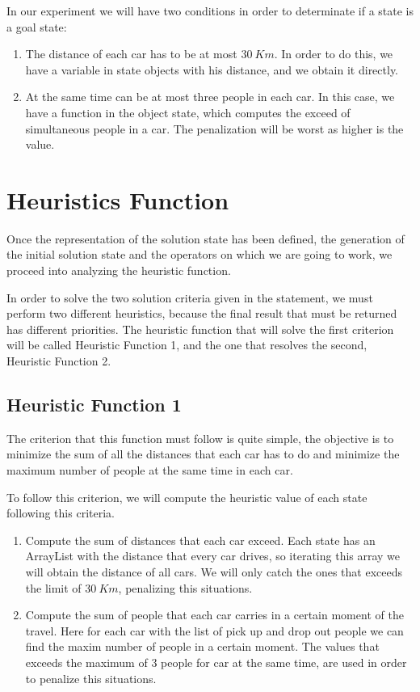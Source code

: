 \documentclass[12]{article}
\begin{document}
In our experiment we will have two conditions in order to determinate if a state is a goal state:

\begin{enumerate}
  \item The distance of each car has to be at most $30\ Km$. In order to do this, we have a variable in state objects with his distance, and we obtain it directly.
  \item At the same time can be at most three people in each car. In this case, we have a function in the object state, which computes the exceed of simultaneous people in a car. The penalization will be worst as higher is the value.
\end{enumerate}

\section{Heuristics Function} \label{heuristics}
Once the representation of the solution state has been defined, the generation of the initial solution state and the operators on which we are going to work, we proceed into analyzing the heuristic function. 

In order to solve the two solution criteria given in the statement, we must perform two different heuristics, because the final result that must be returned has different priorities. The heuristic function that will solve the first criterion will be called Heuristic Function 1, and the one that resolves the second, Heuristic Function 2. 

\subsection{Heuristic Function 1}

The criterion that this function must follow is quite simple, the objective is to minimize the sum of all the distances that each car has to do and minimize the maximum number of people at the same time in each car.

To follow this criterion, we will compute the heuristic value of each state following this criteria.

\begin{enumerate}
  \item Compute the sum of distances that each car exceed. Each state has an ArrayList with the distance that every car drives, so iterating this array we will obtain the distance of all cars. We will only catch the ones that exceeds the limit of $30\ Km$, penalizing this situations.
  \item Compute the sum of people that each car carries in a certain moment of the travel. Here for each car with the list of pick up and drop out people we can find the maxim number of people in a certain moment. The values that exceeds the maximum of 3 people for car at the same time, are used in order to penalize this situations.
\end{enumerate}
\end{document}
